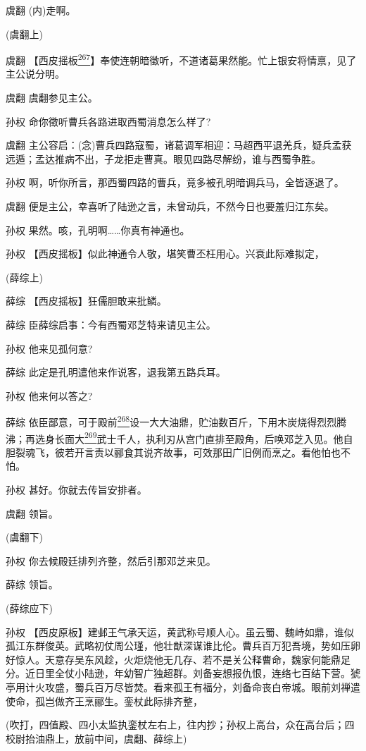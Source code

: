 虞翻 (内)走啊。

(虞翻上)

虞翻
【西皮摇板\protect\hyperlink{fn267}{\textsuperscript{267}}】奉使连朝暗徵听，不道诸葛果然能。忙上银安将情禀，见了主公说分明。

虞翻 虞翻参见主公。

孙权 命你徵听曹兵各路进取西蜀消息怎么样了?

虞翻
主公容启：(念)曹兵四路寇蜀，诸葛调军相迎：马超西平退羌兵，疑兵孟获远遁；孟达推病不出，子龙拒走曹真。眼见四路尽解纷，谁与西蜀争胜。

孙权 啊，听你所言，那西蜀四路的曹兵，竟多被孔明暗调兵马，全皆逐退了。

虞翻 便是主公，幸喜听了陆逊之言，未曾动兵，不然今日也要羞归江东矣。

孙权 果然。咳，孔明啊\ldots{}\ldots{}你真有神通也。

孙权 【西皮摇板】似此神通令人敬，堪笑曹丕枉用心。兴衰此际难拟定，

(薛综上)

薛综 【西皮摇板】狂儒胆敢来批鳞。

薛综 臣薛综启事：今有西蜀邓芝特来请见主公。

孙权 他来见孤何意?

薛综 此定是孔明遣他来作说客，退我第五路兵耳。

孙权 他来何以答之?

薛综
依臣鄙意，可于殿前\protect\hyperlink{fn268}{\textsuperscript{268}}设一大大油鼎，贮油数百斤，下用木炭烧得烈烈腾沸；再选身长面大\protect\hyperlink{fn269}{\textsuperscript{269}}武士千人，执利刃从宫门直排至殿角，后唤邓芝入见。他自胆裂魂飞，彼若开言责以郦食其说齐故事，可效那田广旧例而烹之。看他怕也不怕。

孙权 甚好。你就去传旨安排者。

虞翻 领旨。

(虞翻下)

孙权 你去候殿廷排列齐整，然后引那邓芝来见。

薛综 领旨。

(薛综应下)

孙权
【西皮原板】建邺王气承天运，黄武称号顺人心。虽云蜀、魏峙如鼎，谁似孤江东群俊英。武略初仗周公瑾，他壮猷深谋谁比伦。曹兵百万犯吾境，势如压卵好惊人。天意存吴东风趁，火炬烧他无几存、若不是关公释曹命，魏家何能鼎足分。近日里全仗小陆逊，年幼智广独超群。刘备妄想报仇恨，连络七百结下营。猇亭用计火攻盛，蜀兵百万尽皆焚。看来孤王有福分，刘备命丧白帝城。眼前刘禅遣使命，孤岂做齐王烹郦生。銮杖此际排齐整，

(吹打，四值殿、四小太监执銮杖左右上，往内抄；孙权上高台，众在高台后；四校尉抬油鼎上，放前中间，虞翻、薛综上)

